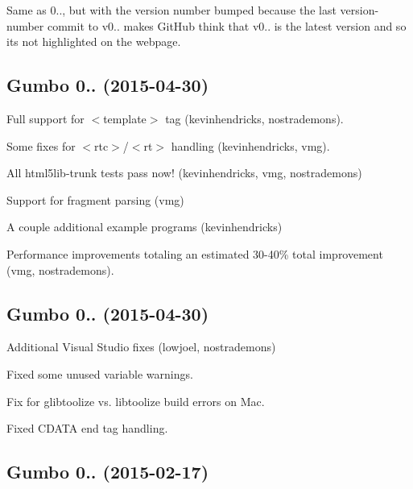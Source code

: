 Same as 0.., but with the version number bumped because the last version-\/number commit to v0.. makes Git\+Hub think that v0.. is the latest version and so it\textquotesingle{}s not highlighted on the webpage.

\subsection*{Gumbo 0.. (2015-\/04-\/30)}


\begin{DoxyItemize}
\item Full support for {\ttfamily $<$template$>$} tag (kevinhendricks, nostrademons).
\item Some fixes for {\ttfamily $<$rtc$>$}/{\ttfamily $<$rt$>$} handling (kevinhendricks, vmg).
\item All html5lib-\/trunk tests pass now! (kevinhendricks, vmg, nostrademons)
\item Support for fragment parsing (vmg)
\item A couple additional example programs (kevinhendricks)
\item Performance improvements totaling an estimated 30-\/40\% total improvement (vmg, nostrademons).
\end{DoxyItemize}

\subsection*{Gumbo 0.. (2015-\/04-\/30)}


\begin{DoxyItemize}
\item Additional Visual Studio fixes (lowjoel, nostrademons)
\item Fixed some unused variable warnings.
\item Fix for glibtoolize vs. libtoolize build errors on Mac.
\item Fixed {\ttfamily C\+D\+A\+TA} end tag handling.
\end{DoxyItemize}

\subsection*{Gumbo 0.. (2015-\/02-\/17)}


